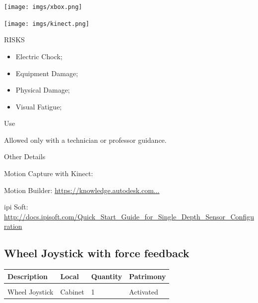 \begin{multicols}{2}


\texttt{[image: imgs/xbox.png]}

\texttt{[image: imgs/kinect.png]}

\columnbreak

\begin{mdframed}[roundcorner=10pt, linecolor=red, linewidth=2pt]
\vspace{1em}
{\Large {\color{red}RISKS}}
\vspace{1em}

\begin{itemize}
    \item Electric Chock;
    \item Equipment Damage;
    \item Physical Damage;
    \item Visual Fatigue; 
\end{itemize}

\vspace{1em}
\end{mdframed}

\vspace{2em}

{\Large Use}
\vspace{1em}

Allowed only with a technician or professor guidance.
\end{multicols}

{\Large Other Details}
\vspace{1em}

Motion Capture with Kinect:

Motion Builder: \href{https://knowledge.autodesk.com/support/motionbuilder/learn-explore/caas/CloudHelp/cloudhelp/2017/ENU/MotionBuilder/files/GUID-60A372EC-154D-402A-B56F-DC41FE3FF41F-htm.html}{https://knowledge.autodesk.com...}

ipi Soft: \url{http://docs.ipisoft.com/Quick_Start_Guide_for_Single_Depth_Sensor_Configuration}


\newpage

\subsection{Wheel Joystick with force feedback}
\begin{tabularx}{\textwidth}{ Y  Y  Y  Y }
    \textbf{Description} &  \textbf{Local} &  \textbf{Quantity} & \textbf{Patrimony}\\
    \hline \\
     Wheel Joystick & Cabinet & 1 & Activated
\end{tabularx}
\vspace{1cm}

